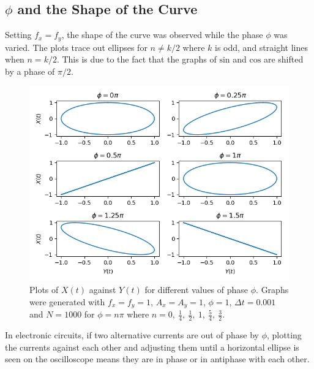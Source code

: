 \documentclass{article}
\begin{document}
	\subsection{$\phi$ and the Shape of the Curve}
		Setting $f_x=f_y$, the shape of the curve was observed while the phase $\phi$ was varied. The plots trace out ellipses for $n \neq k/2$ where $k$ is odd, and straight lines when $n = k/2$. This is due to the fact that the graphs of $\mathrm{sin}$ and $\mathrm{cos}$ are shifted by a phase of $\pi/2$. 

		\begin{figure}[H]
			\centering
			\includegraphics[scale=0.7]{plots/phase.png}
			\caption
			{
				Plots of $X(t)$ against $Y(t)$ for different values of phase $\phi$. Graphs were generated with $f_x = f_y = 1$, $A_x =A_y = 1$, $\phi = 1$, $\Delta{t} = 0.001$ and $N = 1000$ for $\phi = n \pi$ where $n = 0, \ \frac{1}{4}, \ \frac{1}{2}, \ 1, \ \frac{5}{4}, \ \frac{3}{2}$.  
			}    
		\end{figure}

		In electronic circuits, if two alternative currents are out of phase by $\phi$, plotting the currents against each other and adjusting them until a horizontal ellipse is seen on the oscilloscope means they are in phase or in antiphase with each other. 
\end{document}
